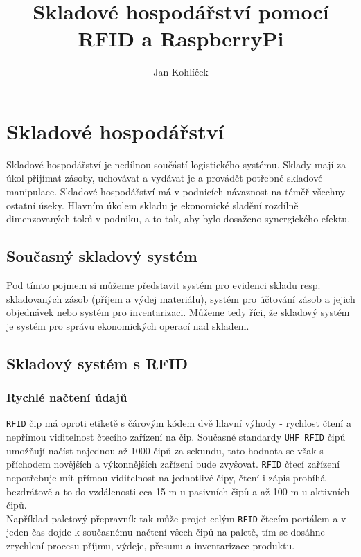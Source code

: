 \documentclass[czech,BP]{thesiskiv}
\author{Jan Kohlíček}
\title{Skladové hospodářství pomocí RFID a RaspberryPi}
\begin{document}
\maketitle
\tableofcontents


\chapter{Skladové hospodářství}
Skladové hospodářství je nedílnou součástí logistického systému. Sklady mají za úkol přijímat zásoby, uchovávat a vydávat je a provádět potřebné skladové manipulace. Skladové hospodářství má v podnicích návaznost na téměř všechny ostatní úseky. Hlavním úkolem skladu je ekonomické sladění rozdílně dimenzovaných toků v podniku, a to tak, aby bylo dosaženo synergického efektu.\cite{vitek2007skladove}


\section{Současný skladový systém}
Pod tímto pojmem si můžeme představit systém pro evidenci skladu resp. skladovaných zásob (příjem  a  výdej  materiálu), systém pro účtování zásob a jejich objednávek nebo systém pro inventarizaci. Můžeme tedy říci, že skladový systém je systém pro správu ekonomických operací nad skladem.\cite{hron2014skladovy}


\section{Skladový systém s RFID}

\subsection{Rychlé načtení údajů}
\texttt{RFID} čip má oproti etiketě s čárovým kódem dvě hlavní výhody - rychlost čtení a nepřímou viditelnost čtecího zařízení na čip. Současné standardy \texttt{UHF RFID} čipů umožňují načíst najednou až 1000 čipů za sekundu, tato hodnota se však s příchodem novějších a výkonnějších zařízení bude zvyšovat. \texttt{RFID} čtecí zařízení nepotřebuje mít přímou viditelnost na jednotlivé čipy, čtení i zápis probíhá bezdrátově a to do vzdálenosti cca 15 m u pasivních čipů a až 100 m u aktivních čipů.\cite{dolevcek2010identifikace}
\\
Například paletový přepravník tak může projet celým \texttt{RFID} čtecím portálem a v jeden čas dojde k současnému načtení všech čipů na paletě, tím se dosáhne zrychlení procesu příjmu, výdeje, přesunu a inventarizace produktu.\cite{dolevcek2010identifikace}
\end{document}

